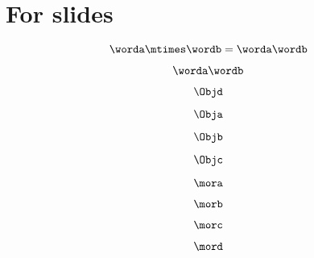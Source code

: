 
\section[For slides]{For slides}


\begin{forslides}

\begin{equation}
            \label{eq:string-semigroup-wordab-2}
            \worda \mtimes  \wordb =  \worda \wordb
        \end{equation}

        \begin{equation}
            \label{eq:string-semigroup-wordab-concat-2}
            \worda \wordb
        \end{equation}

        \begin{equation}
            \label{eq:semicats-slides-00}
            \Objd
        \end{equation}

        \begin{equation}
            \label{eq:semicats-slides-01}
            \Obja
        \end{equation}

        \begin{equation}
            \label{eq:semicats-slides-02}
            \Objb
        \end{equation}

        \begin{equation}
            \label{eq:ssemicats-slides-03}
            \Objc
        \end{equation}

        \begin{equation}
            \label{eq:semicats-slides-04}
            \mora
        \end{equation}

        \begin{equation}
            \label{eq:semicats-slides-05}
            \morb
        \end{equation}

        \begin{equation}
            \label{eq:semicats-slides-06}
            \morc
        \end{equation}

        \begin{equation}
            \label{eq:semicats-slides-07}
            \mord
        \end{equation}


\end{forslides}
